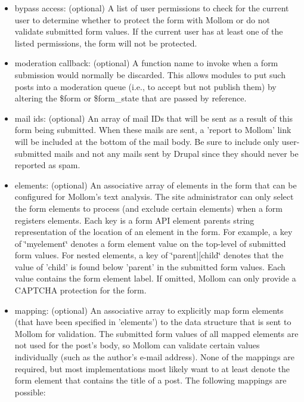 \begin{Desc}
\begin{itemize}
\item bypass access: (optional) A list of user permissions to check for the current user to determine whether to protect the form with Mollom or do not validate submitted form values. If the current user has at least one of the listed permissions, the form will not be protected.\item moderation callback: (optional) A function name to invoke when a form submission would normally be discarded. This allows modules to put such posts into a moderation queue (i.e., to accept but not publish them) by altering the \$form or \$form\_\-state that are passed by reference.\item mail ids: (optional) An array of mail IDs that will be sent as a result of this form being submitted. When these mails are sent, a 'report to Mollom' link will be included at the bottom of the mail body. Be sure to include only user-submitted mails and not any mails sent by Drupal since they should never be reported as spam.\item elements: (optional) An associative array of elements in the form that can be configured for Mollom's text analysis. The site administrator can only select the form elements to process (and exclude certain elements) when a form registers elements. Each key is a form API element parents string representation of the location of an element in the form. For example, a key of \char`\"{}myelement\char`\"{} denotes a form element value on the top-level of submitted form values. For nested elements, a key of \char`\"{}parent\mbox{]}\mbox{[}child\char`\"{} denotes that the value of 'child' is found below 'parent' in the submitted form values. Each value contains the form element label. If omitted, Mollom can only provide a CAPTCHA protection for the form.\item mapping: (optional) An associative array to explicitly map form elements (that have been specified in 'elements') to the data structure that is sent to Mollom for validation. The submitted form values of all mapped elements are not used for the post's body, so Mollom can validate certain values individually (such as the author's e-mail address). None of the mappings are required, but most implementations most likely want to at least denote the form element that contains the title of a post. The following mappings are possible:\begin{itemize}

\end{itemize}
\end{itemize}
\end{Desc}
